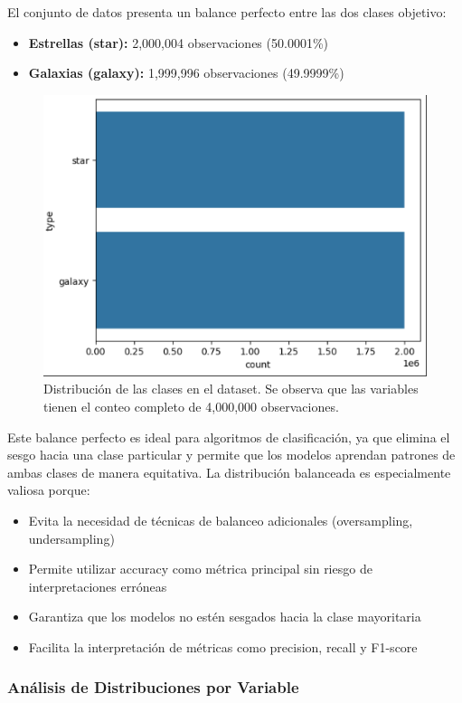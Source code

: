 \documentclass{article}
\begin{document}
El conjunto de datos presenta un balance perfecto entre las dos clases objetivo:

\begin{itemize}
    \item \textbf{Estrellas (star):} 2,000,004 observaciones (50.0001\%)
    \item \textbf{Galaxias (galaxy):} 1,999,996 observaciones (49.9999\%)
\end{itemize}

\begin{figure}[H]
    \centering
    \includegraphics[width=0.5\linewidth]{count.png}
    \caption{Distribución de las clases en el dataset. Se observa que las variables tienen el conteo completo de 4,000,000 observaciones.}
    \label{fig:count}
\end{figure}


Este balance perfecto es ideal para algoritmos de clasificación, ya que elimina el sesgo hacia una clase particular y permite que los modelos aprendan patrones de ambas clases de manera equitativa. La distribución balanceada es especialmente valiosa porque:

\begin{itemize}
    \item Evita la necesidad de técnicas de balanceo adicionales (oversampling, undersampling)
    \item Permite utilizar accuracy como métrica principal sin riesgo de interpretaciones erróneas
    \item Garantiza que los modelos no estén sesgados hacia la clase mayoritaria
    \item Facilita la interpretación de métricas como precision, recall y F1-score
\end{itemize}

\subsubsection{Análisis de Distribuciones por Variable}
\end{document}
